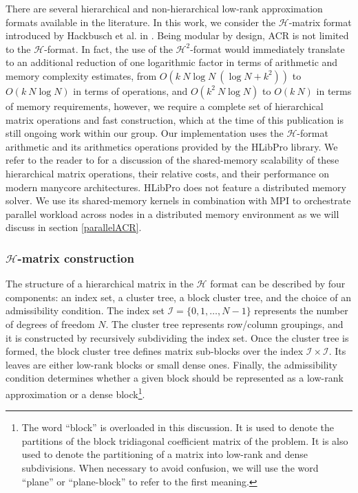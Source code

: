 \documentclass[]{elsarticle}
\begin{document}
There are several hierarchical and non-hierarchical low-rank approximation formats available in the literature. In this work, we consider the $\mathcal{H}$-matrix format introduced by Hackbusch et al. in \cite{hackbusch99}. Being modular by design, ACR is not limited to the $\mathcal{H}$-format. In fact, the use of the $\mathcal{H}^2$-format would immediately translate to an additional reduction of one logarithmic factor in terms of arithmetic and memory complexity estimates, from $O(k~N \log N~(\log N + k^2))$ to $O(k~N \log N)$ in terms of operations, and $O(k^2~N \log N)$ to $O(k~N)$ in terms of memory requirements, however, we require a complete set of hierarchical matrix operations and fast construction, which at the time of this publication is still ongoing work within our group. Our implementation uses the $\mathcal{H}$-format arithmetic and its arithmetics operations provided by the HLibPro library. We refer to the reader to \cite{kriem05,Kriemann2014} for a discussion of the shared-memory scalability of these hierarchical matrix operations, their relative costs, and their performance on modern manycore architectures. HLibPro does not feature a distributed memory solver. We use its shared-memory kernels in combination with MPI to orchestrate parallel workload across nodes in a distributed memory environment as we will discuss in section \ref{parallelACR}.

\subsubsection{$\mathcal{H}$-matrix construction}
\label{sec:H_matrix_construction}

The structure of a hierarchical matrix in the $\mathcal{H}$ format can be described by four components: an index set, a cluster tree, a block cluster tree, and the choice of an admissibility condition. The index set $\mathcal{I} = \{0,1,\dots,N-1\}$ represents the number of degrees of freedom $N$. The cluster tree represents row/column groupings, and it is constructed by recursively subdividing the index set.  Once the cluster tree is formed, the block cluster tree defines matrix sub-blocks over the index $\mathcal{I} \times \mathcal{I}$. Its leaves are either low-rank blocks or small dense ones.  Finally, the admissibility condition determines whether a given block should be represented as a low-rank approximation or a dense block\footnote{The word ``block'' is overloaded in this discussion. It is used to denote the partitions of the block tridiagonal coefficient matrix of the problem. It is also used to denote the partitioning of a matrix into low-rank and dense subdivisions. When necessary to avoid confusion, we will use the word ``plane'' or ``plane-block'' to refer to the first meaning.}.
\end{document}
